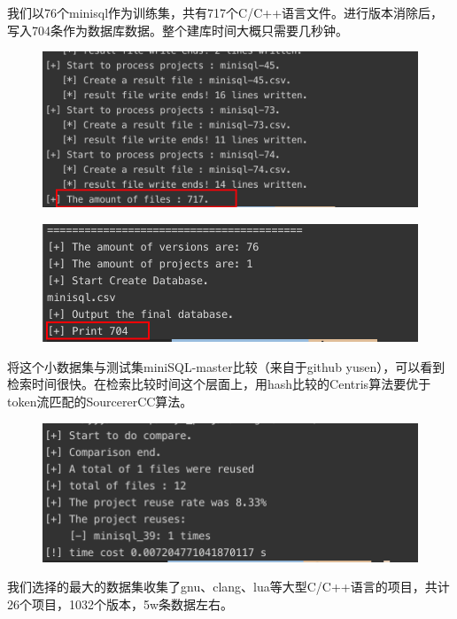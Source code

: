 \documentclass{cjc}
\begin{document}
我们以76个minisql作为训练集，共有717个C/C++语言文件。进行版本消除后，写入704条作为数据库数据。整个建库时间大概只需要几秒钟。
\begin{figure}[htb]
  \centering
  \includegraphics[width=\linewidth]{pics/minisql_dbs.png}
\end{figure}

\begin{figure}[htb]
  \centering
  \includegraphics[width=\linewidth]{pics/minisql_dbs2.png}
\end{figure}

将这个小数据集与测试集miniSQL-master比较（来自于github yusen），可以看到检索时间很快。在检索比较时间这个层面上，用hash比较的Centris算法要优于token流匹配的SourcererCC算法。

\begin{figure}[htb]
  \centering
  \includegraphics[width=\linewidth]{pics/centris_minisql.png}
\end{figure}
   

我们选择的最大的数据集收集了gnu、clang、lua等大型C/C++语言的项目，共计26个项目，1032个版本，5w条数据左右。
\end{document}
